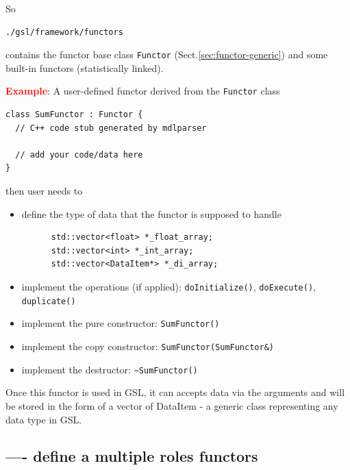 So 
\begin{verbatim}
./gsl/framework/functors
\end{verbatim}
contains the functor base class \verb!Functor!
(Sect.\ref{sec:functor-generic}) and some built-in functors (statistically
linked).

\textcolor{red}{\bf Example}: A user-defined functor  derived from the
\verb!Functor! class
\begin{verbatim}
class SumFunctor : Functor {
  // C++ code stub generated by mdlparser
  
  // add your code/data here
}
\end{verbatim}

then user needs to
\begin{itemize}
  \item define the type of data that the functor is supposed to handle
\begin{verbatim}
      std::vector<float> *_float_array;                                                                                                                                                             
      std::vector<int> *_int_array;                                                                           
      std::vector<DataItem*> *_di_array;           
\end{verbatim}  

  \item implement the operations (if applied): \verb!doInitialize()!,
  \verb!doExecute()!, \verb!duplicate()! 
  
  \item implement the pure constructor: \verb!SumFunctor()!
  
  \item implement the copy constructor: \verb!SumFunctor(SumFunctor&)!
  
  \item implement the destructor: \verb!~SumFunctor()!
  
\end{itemize}

Once this functor is used in GSL, it can accepts data via the arguments and will
be stored in the form of a vector of DataItem - a generic class representing any
data type in GSL.


\subsection{---- define a multiple roles functors}

